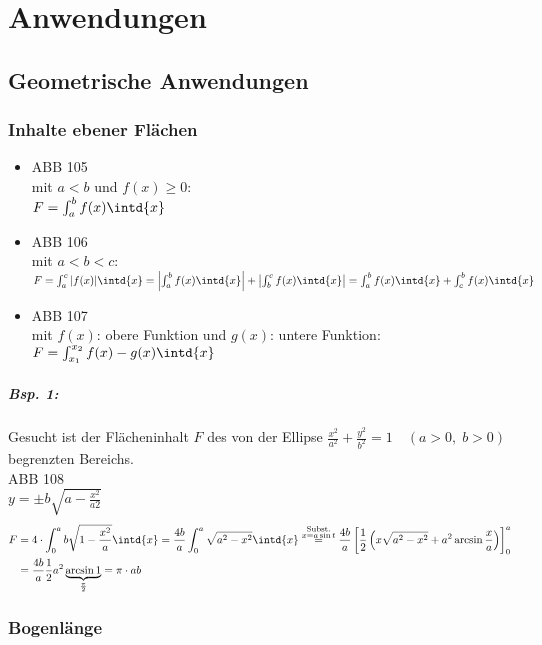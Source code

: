 \section{Anwendungen}
\subsection{Geometrische Anwendungen}
\subsubsection{Inhalte ebener Flächen}
\begin{itemize}
\item ABB 105\\
mit $a<b$ und $f(x) \geq 0$:\\
$F=\int_a^b f(x) \intd{x}$
\item ABB 106\\
mit $a<b<c$:\\
$F=\int_a^c |f(x)| \intd{x}=\left| \int_a^b f(x) \intd{x}\right| + \left| \int_b^c f(x) \intd{x}\right|= \int_a^b f(x) \intd{x} + \int_c^b f(x) \intd{x}$
\item ABB 107\\
mit $f(x)$: obere Funktion und $g(x)$: untere Funktion:\\
$F=\int_{x_1}^{x_2} f(x) - g(x) \intd{x}$
\end{itemize}
\subparagraph{Bsp. 1:} Gesucht ist der Flächeninhalt $F$ des von der Ellipse $\frac{x^2}{a^2}+\frac{y^2}{b^2}=1 \quad (a>0, \; b>0)$ begrenzten Bereichs.\\
ABB 108\\
$y= \pm b\sqrt{a-\frac{x^2}{a2}}$
\begin{align*}
F&=4 \cdot \int_0^a b \sqrt{1-\frac{x^2}{a}}\intd{x}=\frac{4b}{a}\int_0^a\sqrt{a^2-x^2}\intd{x}\overset{\substack{\text{Subst.}\\x=a\sin t}}{=}\frac{4b}{a}\left[\frac{1}{2}\left(x\sqrt{a^2-x^2}+a^2 \arcsin\frac{x}{a}\right)\right]_0^a\\
&=\frac{4b}{a}\frac{1}{2}a^2\underbrace{\arcsin 1}_{\frac{\pi}{2}}=\pi \cdot ab
\end{align*}

\subsubsection{Bogenlänge}
